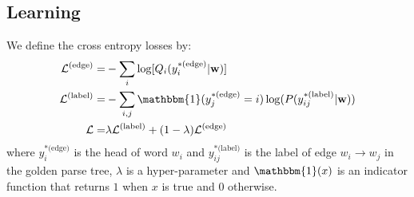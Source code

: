 \documentclass[11pt,a4paper]{article}
\begin{document}
\subsection{Learning}
\label{sec:loss}
We define the cross entropy losses by:
\begin{align}
\mathcal{L}^{\text{(edge)}}=&-\sum_{i}\log[Q_i(y_{i}^{*\textrm{(edge)}}|\mathbf{w})] \nonumber\\
\mathcal{L}^{\textrm{(label)}}  =& -\sum_{i,j}\mathbbm{1}(y_{j}^{*\textrm{(edge)}}=i) \log(P (y_{ij}^{*\textrm{(label)}}|\mathbf{w}))\nonumber\\
    \mathcal{L} =& \lambda \mathcal{L}^{\text{(label)}} + (1-\lambda) \mathcal{L}^{\text{(edge)}}\nonumber
\end{align}
where $y_i^{*\textrm{(edge)}}$ is the head of word $w_i$ and $y_{ij}^{*\text{(label)}}$ is the label of edge $w_i\rightarrow w_j$ in the golden parse tree, $\lambda$ is a hyper-parameter and $\mathbbm{1}(x)$ is an indicator function that returns $1$ when $x$ is true and $0$ otherwise. 
\end{document}
